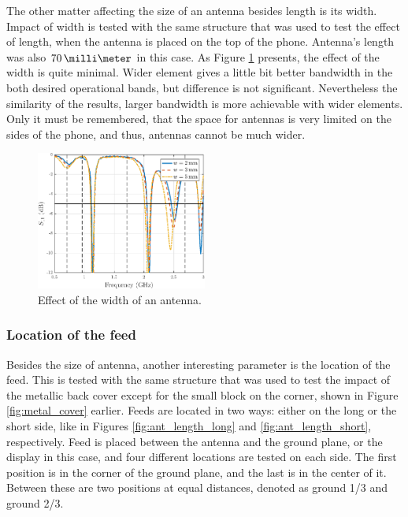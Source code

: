 The other matter affecting the size of an antenna besides length is its width. Impact of width is tested with the same structure that was used to test the effect of length, when the antenna is placed on the top of the phone. Antenna's length was also $70\,\milli\meter$ in this case. As Figure \ref{fig:width_res} presents, the effect of the width is quite minimal. Wider element gives a little bit better bandwidth in the both desired operational bands, but difference is not significant. Nevertheless the similarity of the results, larger bandwidth is more achievable with wider elements. Only it must be remembered, that the space for antennas is very limited on the sides of the phone, and thus, antennas cannot be much wider.

\begin{figure}[H]
    \centering
    \includegraphics[width=0.5\textwidth]{img/width_res.eps}
    \caption{Effect of the width of an antenna.}
    \label{fig:width_res}
\end{figure}


\subsubsection{Location of the feed}
\label{sec:feed}
Besides the size of antenna, another interesting parameter is the location of the feed. This is tested with the same structure that was used to test the impact of the metallic back cover except for the small block on the corner, shown in Figure \ref{fig:metal_cover} earlier. Feeds are located in two ways: either on the long or the short side, like in Figures \ref{fig:ant_length_long} and \ref{fig:ant_length_short}, respectively. Feed is placed between the antenna and the ground plane, or the display in this case, and four different locations are tested on each side. The first position is in the corner of the ground plane, and the last is in the center of it. Between these are two positions at equal distances, denoted as ground 1/3 and ground 2/3.


